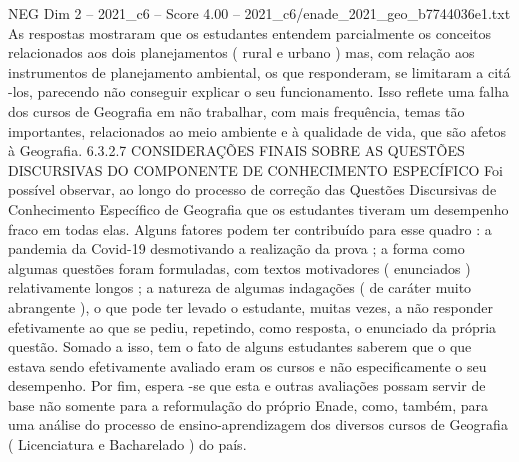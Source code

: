 \begin{textsample}{NEG Dim 2 – 2021\_c6 – Score 4.00 – 2021\_c6/enade\_2021\_geo\_b7744036e1.txt}
As respostas mostraram que os estudantes entendem parcialmente os conceitos relacionados aos dois planejamentos ( rural e urbano ) mas, com relação aos instrumentos de planejamento ambiental, os que responderam, se limitaram a citá -los, parecendo não conseguir explicar o seu funcionamento.
Isso reflete uma falha dos cursos de Geografia em não trabalhar, com mais frequência, temas tão importantes, relacionados ao meio ambiente e à qualidade de vida, que são afetos à Geografia. 6.3.2.7 CONSIDERAÇÕES FINAIS SOBRE AS QUESTÕES DISCURSIVAS DO COMPONENTE DE CONHECIMENTO ESPECÍFICO Foi possível observar, ao longo do processo de correção das Questões Discursivas de Conhecimento Específico de Geografia que os estudantes tiveram um desempenho fraco em todas elas.
Alguns fatores podem ter contribuído para esse quadro : a pandemia da Covid-19 desmotivando a realização da prova ; a forma como algumas questões foram formuladas, com textos motivadores ( enunciados ) relativamente longos ; a natureza de algumas indagações ( de caráter muito abrangente ), o que pode ter levado o estudante, muitas vezes, a não responder efetivamente ao que se pediu, repetindo, como resposta, o enunciado da própria questão.
Somado a isso, tem o fato de alguns estudantes saberem que o que estava sendo efetivamente avaliado eram os cursos e não especificamente o seu desempenho.
Por fim, espera -se que esta e outras avaliações possam servir de base não somente para a reformulação do próprio Enade, como, também, para uma análise do processo de ensino-aprendizagem dos diversos cursos de Geografia ( Licenciatura e Bacharelado ) do país.

\end{textsample}
